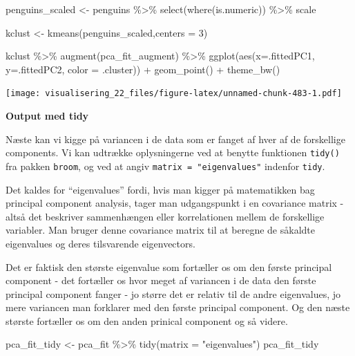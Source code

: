 \documentclass[
]{book}
\newenvironment{Shaded}{\begin{snugshade}}{\end{snugshade}}
\newcommand{\AttributeTok}[1]{\textcolor[rgb]{0.77,0.63,0.00}{#1}}
\newcommand{\DecValTok}[1]{\textcolor[rgb]{0.00,0.00,0.81}{#1}}
\newcommand{\FunctionTok}[1]{\textcolor[rgb]{0.00,0.00,0.00}{#1}}
\newcommand{\NormalTok}[1]{#1}
\newcommand{\OtherTok}[1]{\textcolor[rgb]{0.56,0.35,0.01}{#1}}
\newcommand{\SpecialCharTok}[1]{\textcolor[rgb]{0.00,0.00,0.00}{#1}}
\newcommand{\StringTok}[1]{\textcolor[rgb]{0.31,0.60,0.02}{#1}}
\begin{document}
\begin{Shaded}
\begin{Highlighting}[]
\NormalTok{penguins\_scaled }\OtherTok{\textless{}{-}}\NormalTok{ penguins }\SpecialCharTok{\%\textgreater{}\%} \FunctionTok{select}\NormalTok{(}\FunctionTok{where}\NormalTok{(is.numeric)) }\SpecialCharTok{\%\textgreater{}\%}\NormalTok{ scale}

\NormalTok{kclust }\OtherTok{\textless{}{-}} \FunctionTok{kmeans}\NormalTok{(penguins\_scaled,}\AttributeTok{centers =} \DecValTok{3}\NormalTok{)}

\NormalTok{kclust }\SpecialCharTok{\%\textgreater{}\%} \FunctionTok{augment}\NormalTok{(pca\_fit\_augment)  }\SpecialCharTok{\%\textgreater{}\%} 
  \FunctionTok{ggplot}\NormalTok{(}\FunctionTok{aes}\NormalTok{(}\AttributeTok{x=}\NormalTok{.fittedPC1, }\AttributeTok{y=}\NormalTok{.fittedPC2, }\AttributeTok{color =}\NormalTok{ .cluster)) }\SpecialCharTok{+} 
  \FunctionTok{geom\_point}\NormalTok{() }\SpecialCharTok{+}
  \FunctionTok{theme\_bw}\NormalTok{()}
\end{Highlighting}
\end{Shaded}

\texttt{[image: visualisering\_22\_files/figure-latex/unnamed-chunk-483-1.pdf]}

\textbf{Output med tidy}

Næste kan vi kigge på variancen i de data som er fanget af hver af de forskellige components. Vi kan udtrække oplysningerne ved at benytte funktionen \texttt{tidy()} fra pakken \texttt{broom}, og ved at angiv \texttt{matrix\ =\ "eigenvalues"} indenfor \texttt{tidy}.

Det kaldes for ``eigenvalues'' fordi, hvis man kigger på matematikken bag principal component analysis, tager man udgangspunkt i en covariance matrix - altså det beskriver sammenhængen eller korrelationen mellem de forskellige variabler. Man bruger denne covariance matrix til at beregne de såkaldte eigenvalues og deres tilsvarende eigenvectors.

Det er faktisk den største eigenvalue som fortæller os om den første principal component - det fortæller os hvor meget af variancen i de data den første principal component fanger - jo større det er relativ til de andre eigenvalues, jo mere variancen man forklarer med den første principal component. Og den næste største fortæller os om den anden prinical component og så videre.

\begin{Shaded}
\begin{Highlighting}[]
\NormalTok{pca\_fit\_tidy }\OtherTok{\textless{}{-}}\NormalTok{ pca\_fit }\SpecialCharTok{\%\textgreater{}\%}
  \FunctionTok{tidy}\NormalTok{(}\AttributeTok{matrix =} \StringTok{"eigenvalues"}\NormalTok{)}
\NormalTok{pca\_fit\_tidy}
\end{Highlighting}
\end{Shaded}
\end{document}
